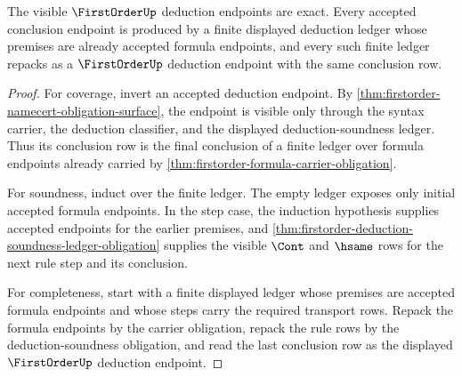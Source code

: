 \begin{theorem}\label{thm:firstorder-deduction-endpoint-exactness}
The visible $\FirstOrderUp$ deduction endpoints are exact. Every accepted
conclusion endpoint is produced by a finite displayed deduction ledger whose
premises are already accepted formula endpoints, and every such finite ledger
repacks as a $\FirstOrderUp$ deduction endpoint with the same conclusion row.
\end{theorem}
\begin{proof}
For coverage, invert an accepted deduction endpoint. By
\autoref{thm:firstorder-namecert-obligation-surface}, the endpoint is visible
only through the syntax carrier, the deduction classifier, and the displayed
deduction-soundness ledger. Thus its conclusion row is the final conclusion
of a finite ledger over formula endpoints already carried by
\autoref{thm:firstorder-formula-carrier-obligation}.

For soundness, induct over the finite ledger. The empty ledger exposes only
initial accepted formula endpoints. In the step case, the induction
hypothesis supplies accepted endpoints for the earlier premises, and
\autoref{thm:firstorder-deduction-soundness-ledger-obligation} supplies the
visible $\Cont$ and $\hsame$ rows for the next rule step and its conclusion.

For completeness, start with a finite displayed ledger whose premises are
accepted formula endpoints and whose steps carry the required transport rows.
Repack the formula endpoints by the carrier obligation, repack the rule rows
by the deduction-soundness obligation, and read the last conclusion row as
the displayed $\FirstOrderUp$ deduction endpoint.
\end{proof}

